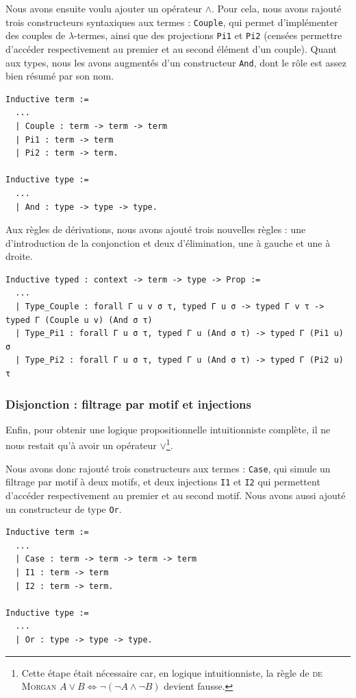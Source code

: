 \documentclass[a4paper]{article}
\theoremstyle{remark}
\theoremstyle{remark}
\theoremstyle{remark}
\theoremstyle{definition}
\theoremstyle{definition}
\theoremstyle{definition}
\begin{document}
Nous avons ensuite voulu ajouter un opérateur $\wedge$. Pour cela, nous avons rajouté trois constructeurs syntaxiques aux termes : \verb+Couple+, qui permet d'implémenter des couples de $\lambda$-termes, ainsi que des projections \verb+Pi1+ et \verb+Pi2+ (censées permettre d'accéder respectivement au premier et au second élément d'un couple). Quant aux types, nous les avons augmentés d'un constructeur \verb+And+, dont le rôle est assez bien résumé par son nom.
\begin{verbatim}
Inductive term :=
  ...
  | Couple : term -> term -> term
  | Pi1 : term -> term
  | Pi2 : term -> term.

Inductive type :=
  ...
  | And : type -> type -> type.
\end{verbatim}

Aux règles de dérivations, nous avons ajouté trois nouvelles règles : une d'introduction de la conjonction et deux d'élimination, une à gauche et une à droite.
\begin{verbatim}
Inductive typed : context -> term -> type -> Prop :=
  ...
  | Type_Couple : forall Γ u v σ τ, typed Γ u σ -> typed Γ v τ -> typed Γ (Couple u v) (And σ τ)
  | Type_Pi1 : forall Γ u σ τ, typed Γ u (And σ τ) -> typed Γ (Pi1 u) σ
  | Type_Pi2 : forall Γ u σ τ, typed Γ u (And σ τ) -> typed Γ (Pi2 u) τ
\end{verbatim}

\subsubsection{Disjonction : filtrage par motif et injections}

Enfin, pour obtenir une logique propositionnelle intuitionniste complète, il ne nous restait qu'à avoir un opérateur $\vee$\footnote{Cette étape était nécessaire car, en logique intuitionniste, la règle de \textsc{de Morgan} $A \vee B \Leftrightarrow \neg (\neg A \wedge \neg B)$ devient fausse.}.

Nous avons donc rajouté trois constructeurs aux termes : \verb+Case+, qui simule un filtrage par motif à deux motifs, et deux injections \verb+I1+ et \verb+I2+ qui permettent d'accéder respectivement au premier et au second motif. Nous avons aussi ajouté un constructeur de type \verb+Or+.
\begin{verbatim}
Inductive term :=
  ...
  | Case : term -> term -> term -> term
  | I1 : term -> term
  | I2 : term -> term.

Inductive type :=
  ...
  | Or : type -> type -> type.
\end{verbatim}
\end{document}
